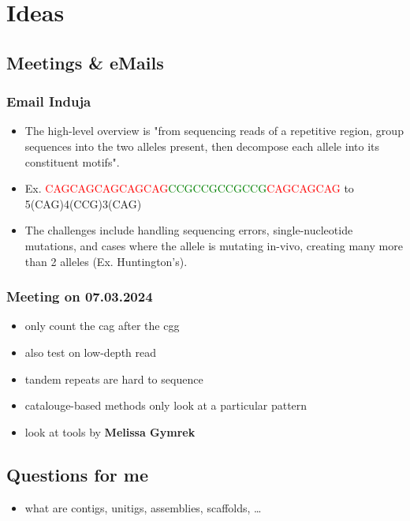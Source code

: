 \newcommand{\sectionName}{Ideas}
\section{\sectionName}
\markboth{\sectionName}{}

\subsection{Meetings \& eMails}

\subsubsection*{Email Induja}
\begin{itemize}
    \item The high-level overview is "from sequencing reads of a repetitive region, group sequences into the two alleles present, then decompose each allele into its constituent motifs".
    \item Ex. \textcolor{red}{CAGCAGCAGCAGCAG}\textcolor{green}{CCGCCGCCGCCG}\textcolor{red}{CAGCAGCAG} to \\5(CAG)4(CCG)3(CAG)
    \item The challenges include handling sequencing errors, single-nucleotide mutations, and cases where the allele is mutating in-vivo, creating many more than 2 alleles (Ex. Huntington's).
\end{itemize}

\subsubsection*{Meeting on 07.03.2024}
\begin{itemize}
    \item only count the cag after the cgg
    \item also test on low-depth read
    \item tandem repeats are hard to sequence
    \item catalouge-based methods only look at a particular pattern
    \item look at tools by \textbf{Melissa Gymrek}
\end{itemize}

\subsection{Questions for me}
\begin{itemize}
    \item what are contigs, unitigs, assemblies, scaffolds, \dots
\end{itemize}

